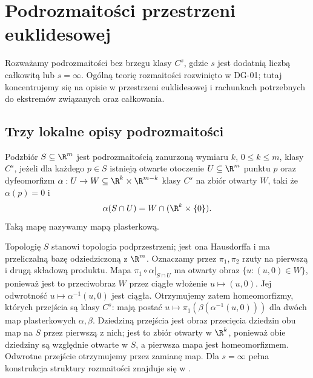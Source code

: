 \chapter{Podrozmaitości przestrzeni euklidesowej}
\label{ma2:ch:submanifolds}

Rozważamy podrozmaitości bez brzegu klasy $C^s$,
gdzie $s$ jest dodatnią liczbą całkowitą lub $s=\infty$.
Ogólną teorię rozmaitości rozwinięto w DG-01; tutaj
koncentrujemy się na opisie w przestrzeni euklidesowej
i rachunkach potrzebnych do ekstremów związanych oraz całkowania.

\section{Trzy lokalne opisy podrozmaitości}

\begin{definicja}
\label{ma2:def:submanifold}
Podzbiór $S\subseteq\R^m$ jest podrozmaitością
zanurzoną wymiaru $k$, $0\le k\le m$, klasy $C^s$,
jeżeli dla każdego $p\in S$ istnieją otwarte
otoczenie $U\subseteq\R^m$ punktu $p$ oraz dyfeomorfizm
$\alpha:U\to W\subseteq\R^k\times\R^{m-k}$
klasy $C^s$ na zbiór otwarty $W$, taki że
$\alpha(p)=0$ i
\[
 \alpha(S\cap U)=W\cap(\R^k\times\{0\}).
\]
Taką mapę nazywamy mapą plasterkową.
\end{definicja}

Topologię $S$ stanowi topologia podprzestrzeni;
jest ona Hausdorffa i ma przeliczalną bazę odziedziczoną
z $\R^m$. Oznaczamy przez $\pi_1,\pi_2$ rzuty na
pierwszą i drugą składową produktu.
Mapa $\pi_1\circ\alpha|_{S\cap U}$ ma otwarty obraz
$\{u:(u,0)\in W\}$, ponieważ jest to przeciwobraz
$W$ przez ciągłe włożenie $u\mapsto(u,0)$.
Jej odwrotność $u\mapsto\alpha^{-1}(u,0)$ jest ciągła.
Otrzymujemy zatem homeomorfizmy, których przejścia są klasy
$C^s$: mają postać $u\mapsto\pi_1(\beta(\alpha^{-1}(u,0)))$
dla dwóch map plasterkowych $\alpha,\beta$.
Dziedziną przejścia jest obraz przecięcia dziedzin
obu map na $S$ przez pierwszą z nich; jest to zbiór
otwarty w $\R^k$, ponieważ obie dziedziny są względnie
otwarte w $S$, a pierwsza mapa jest homeomorfizmem.
Odwrotne przejście otrzymujemy przez zamianę map.
Dla $s=\infty$ pełna konstrukcja struktury rozmaitości
znajduje się w
.

